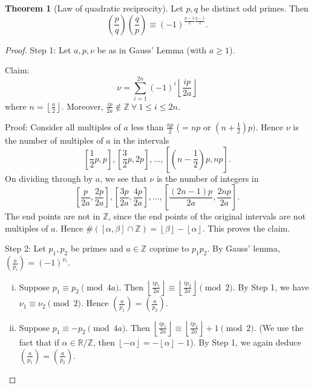 \documentclass{article}
\theoremstyle{definition}
\newtheorem{theorem}{Theorem}[section]
\begin{document}
\begin{theorem}[Law of quadratic reciprocity]
    Let $p,q$ be distinct odd primes. Then \[
    \left(\frac{p}{q}\right)\left(\frac{q}{p}\right) \equiv (-1)^{\frac{p-1}{2}\frac{q-1}{2}}.
    \]
\end{theorem} 
\begin{proof}
    Step 1: Let $a,p,\nu$ be as in Gauss' Lemma (with $a\ge 1$).
    \vspace{1mm}
    
    Claim: $$\nu = \sum_{i=1}^{2n} (-1)^{i} \left\lfloor \frac{ip}{2a} \right\rfloor$$ where $n = \left\lfloor \frac{a}{2} \right\rfloor$. Moreover, $\frac{ip}{2a} \not\in \mathbb{Z} ~\forall~1\le i\le 2n$.
    \vspace{1mm}
    
    Proof: Consider all multiples of $a$ less than $\frac{ap}{2}$ ($=np$ or $(n+\frac{1}{2})p)$. Hence $\nu$ is the number of multiples of $a$ in the intervals $$\left[\frac{1}{2}p,p\right], \left[\frac{3}{2}p, 2p\right],\ldots, \left[(n-\frac{1}{2})p,np\right].$$ On dividing through by $a$, we see that $\nu$ is the number of integers in $$\left[\frac{p}{2a},\frac{2p}{2a}\right],\left[\frac{3p}{2a},\frac{4p}{2a}\right],\ldots,\left[\frac{(2n-1)p}{2a},\frac{2np}{2a}\right].$$ The end points are not in $\mathbb{Z}$, since the end points of the original intervals are not multiples of $a$. Hence $\# ([\alpha,\beta] \cap \mathbb{Z}) = \left\lfloor \beta \right\rfloor - \left\lfloor \alpha \right\rfloor$. This proves the claim.
    \vspace{1mm}
    
    Step 2: Let $p_1,p_2$ be primes and $a \in \mathbb{Z}$ coprime to $p_1p_2$. By Gauss' lemma, $\left(\frac{a}{p_i}\right) = (-1)^{\nu_i}$.
    \begin{enumerate}[(i)]
        \item Suppose $p_1 \equiv p_2 \pmod{4a}$. Then $\left\lfloor \frac{ip_1}{2a} \right\rfloor \equiv \left\lfloor \frac{ip_2}{2a} \right\rfloor \pmod{2}$. By Step 1, we have $\nu_1 \equiv \nu_2 \pmod{2}$. Hence $\left(\frac{a}{p_1}\right) = \left(\frac{a}{p_2}\right)$.
        \item Suppose $p_1 \equiv -p_2 \pmod{4a}$. Then $\left\lfloor \frac{ip_1}{2a} \right\rfloor \equiv \left\lfloor \frac{ip_2}{2a} \right\rfloor +1 \pmod{2}$. (We use the fact that if $\alpha \in \mathbb{R}/\mathbb{Z}$, then $\left\lfloor -\alpha \right\rfloor = -\left\lfloor \alpha \right\rfloor-1$). By Step 1, we again deduce $\left(\frac{a}{p_1}\right) = \left(\frac{a}{p_2}\right)$.
    \end{enumerate}
    \vspace{1mm}
    

\end{proof}
\end{document}
